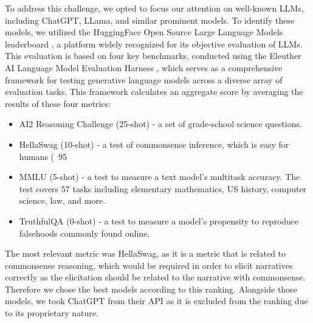 To address this challenge, we opted to focus our attention on well-known LLMs, including ChatGPT, LLama, and similar prominent models. To identify these models, we utilized the HuggingFace Open Source Large Language Models leaderboard \cite{huggingface-leaderboard}, a platform widely recognized for its objective evaluation of LLMs. This evaluation is based on four key benchmarks, conducted using the Eleuther AI Language Model Evaluation Harness \cite{eleuther}, which serves as a comprehensive framework for testing generative language models across a diverse array of evaluation tasks. This framework calculates an aggregate score by averaging the results of these four metrics:
\begin{itemize}
    \item {AI2 Reasoning Challenge (25-shot)} \cite{AI2} - a set of grade-school science questions.
    \item {HellaSwag (10-shot)} \cite{HellaSwag} - a test of commonsense inference, which is easy for humans (~95%
    \item {MMLU (5-shot)} \cite{MMLU} - a test to measure a text model's multitask accuracy. The test covers 57 tasks including elementary mathematics, US history, computer science, law, and more.
    \item {TruthfulQA (0-shot)} \cite{Truthful} - a test to measure a model’s propensity to reproduce falsehoods commonly found online.
\end{itemize}
The most relevant metric was HellaSwag, as it is a metric that is related to commonsense reasoning, which would be required in order to elicit narratives correctly as the elicitation should be related to the narrative with commonsense. Therefore we chose the best models according to this ranking. Alongside those models, we took ChatGPT from their API as it is excluded from the ranking due to its proprietary nature. 

